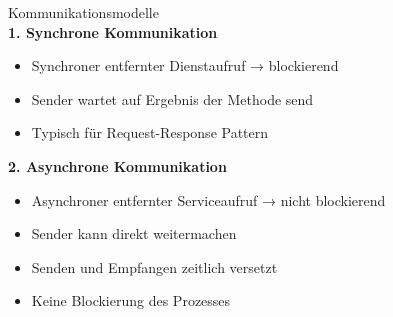 \begin{concept}{Kommunikationsmodelle}\\
\textbf{1. Synchrone Kommunikation}
\begin{itemize}
    \item Synchroner entfernter Dienstaufruf → blockierend
    \item Sender wartet auf Ergebnis der Methode send
    \item Typisch für Request-Response Pattern
\end{itemize}

\textbf{2. Asynchrone Kommunikation}
\begin{itemize}
    \item Asynchroner entfernter Serviceaufruf → nicht blockierend
    \item Sender kann direkt weitermachen
    \item Senden und Empfangen zeitlich versetzt
    \item Keine Blockierung des Prozesses
\end{itemize}
\end{concept}


